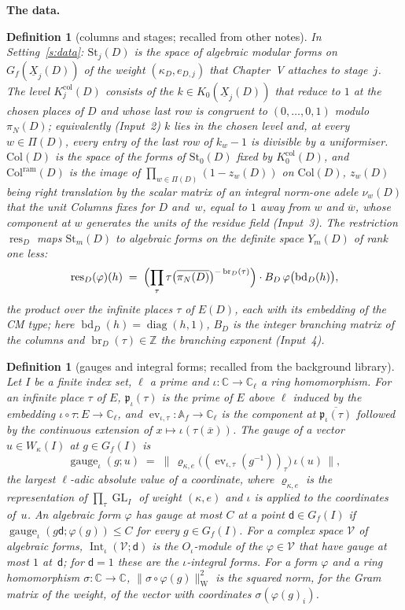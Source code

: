\documentclass[11pt,a4paper]{article}
\newcommand{\kw}[1]{\emph{#1}}
\newcommand{\m}[1]{\mbox{$#1$}}        %
\newcommand{\subhead}[1]{\par\addvspace{9pt plus 2pt}\Needspace{4\baselineskip}\noindent\textbf{#1}\enspace\ignorespaces}
\theoremstyle{plainx}
\theoremstyle{uprightx}
\newtheorem{definition}[theorem]{Definition}
\newcommand{\CC}{\mathbb{C}}
\newcommand{\ZZ}{\mathbb{Z}}
\newcommand{\Af}{\mathbb{A}_f}
\newcommand{\GL}{\operatorname{GL}}
\newcommand{\cj}[1]{\overline{#1}}
\newcommand{\Gf}[1]{G_f(#1)}                   %
\newcommand{\Kz}[1]{K_0(#1)}
\newcommand{\Wk}[1]{W_{\kappa}(#1)}            %
\newcommand{\jm}{\iota}
\newcommand{\Oj}{O_{\iota}}
\newcommand{\ind}[1]{\mathfrak{p}_{\iota}(#1)}%
\newcommand{\evt}[1]{\operatorname{ev}_{\iota,#1}}
\newcommand{\gauge}[2]{\operatorname{gauge}_{\iota}(#1;#2)}
\newcommand{\Int}[2]{\operatorname{Int}_{\iota}(#1;#2)}
\newcommand{\piN}{\pi_N(D)}
\newcommand{\PiD}{\Pi(D)}
\newcommand{\zc}[1]{z_{#1}(D)}                  %
\newcommand{\nuc}[1]{\nu_{#1}(D)}               %
\newcommand{\Col}{\mathrm{Col}(D)}
\newcommand{\Colram}{\mathrm{Col}^{\mathrm{ram}}(D)}
\newcommand{\Kcol}[1]{K^{\mathrm{col}}_{#1}(D)}
\newcommand{\Stg}[1]{\mathrm{St}_{#1}(D)}
\newcommand{\XI}[1]{\underline{X}_{#1}(D)}
\newcommand{\resY}{\operatorname{res}_{D}}
\newcommand{\bdU}{\operatorname{bd}_{D}}
\newcommand{\brE}[1]{\operatorname{br}_{D}(#1)}
\newcommand{\wnorm}[1]{\lVert #1\rVert^{2}_{\mathrm{W}}}
\begin{document}
\subhead{The data.}
\begin{definition}[columns and stages; recalled from other notes]\label{d:columns}
In Setting~\ref{s:data}: \m{\Stg{j}} is the space of algebraic modular forms on \m{\Gf{\XI{j}}} of the weight
\m{(\kappa_D,e_{D,j})} that Chapter~V attaches to stage~$j$. The level \m{\Kcol{j}} consists of the
\m{k\in\Kz{\XI{j}}} that reduce to $1$ at the chosen places of $D$ and whose last row is congruent to
\m{(0,\dots,0,1)} modulo $\piN$; equivalently (Input~2) $k$ lies in the chosen level and, at every \m{w\in\PiD},
every entry of the last row of \m{k_w-1} is divisible by a uniformiser. \m{\Col} is the space of the forms of
\m{\Stg{0}} fixed by \m{\Kcol{0}}, and \m{\Colram} is the image of \m{\prod_{w\in\PiD}(1-\zc{w})} on $\Col$,
$\zc{w}$ being right translation by the scalar matrix of an integral norm-one adele $\nuc{w}$ that the unit
\emph{Columns} fixes for $D$ and~$w$, equal to $1$ away from $w$ and
$\cj{w}$, whose component at $w$ generates the units of the residue field (Input~3). The \kw{restriction}
\m{\resY} maps \m{\Stg{m}} to algebraic forms on the definite space \m{Y_m(D)} of rank one less:
\[
\resY(\varphi)(h)\;=\;\Bigl(\prod_{\tau}\tau\bigl(\cj{\piN}\bigr)^{-\brE{\tau}}\Bigr)\cdot B_D\,\varphi\bigl(\bdU(h)\bigr),
\]
the product over the infinite places $\tau$ of \m{E(D)}, each with its embedding of the CM type; here
\m{\bdU(h)=\operatorname{diag}(h,1)}, $B_D$ is the integer branching matrix of the columns and
\m{\brE{\tau}\in\ZZ} the branching exponent (Input~4).
\end{definition}

\begin{definition}[gauges and integral forms; recalled from the background library]\label{d:gauge}
Let $I$ be a finite index set, $\ell$ a prime and \m{\jm\colon\CC\to\CC_\ell} a ring homomorphism. For an infinite
place $\tau$ of $E$, \m{\ind{\tau}} is the prime of $E$ above $\ell$ induced by the embedding
\m{\jm\circ\tau\colon E\to\CC_\ell}, and \m{\evt{\tau}\colon\Af\to\CC_\ell} is the component at \m{\cj{\ind{\tau}}}
followed by the continuous extension of \m{x\mapsto\jm(\tau(\cj{x}))}. The \kw{gauge} of a vector
\m{u\in\Wk{I}} at \m{g\in\Gf{I}} is
\[
\gauge{g}{u}\;=\;\bigl\lVert\,\varrho_{\kappa,e}\bigl((\evt{\tau}(g^{-1}))_{\tau}\bigr)\,\jm(u)\,\bigr\rVert,
\]
the largest $\ell$-adic absolute value of a coordinate, where \m{\varrho_{\kappa,e}} is the representation of
\m{\prod_\tau\GL_I} of weight \m{(\kappa,e)} and $\jm$ is applied to the coordinates of~$u$. An algebraic form
$\varphi$ \kw{has gauge at most $C$ at a point} \m{\mathsf{d}\in\Gf{I}} if \m{\gauge{g\mathsf{d}}{\varphi(g)}\le C}
for every \m{g\in\Gf{I}}. For a complex space $\mathcal{V}$ of algebraic forms, \m{\Int{\mathcal{V}}{\mathsf{d}}} is
the $\Oj$-module of the \m{\varphi\in\mathcal{V}} that have gauge at most $1$ at~$\mathsf{d}$; for
\m{\mathsf{d}=1} these are the \kw{$\jm$-integral} forms. For a form $\varphi$ and a ring homomorphism
\m{\sigma\colon\CC\to\CC}, \m{\wnorm{\sigma\circ\varphi(g)}} is the squared norm, for the Gram matrix of the weight, of
the vector with coordinates \m{\sigma(\varphi(g)_i)}.
\end{definition}
\end{document}
